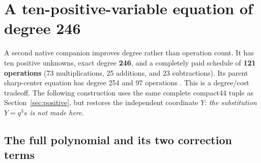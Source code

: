 \section{A ten-positive-variable equation of degree 246}\label{sec:center246}

A second native companion improves degree rather than operation count.
It has ten positive unknowns, exact degree \textbf{246}, and a completely
paid schedule of \textbf{121 operations} (73 multiplications, 25 additions,
and 23 subtractions).  Its parent sharp-center equation has degree 254
and 97 operations \cite{gapfusion}.  This is a degree/cost tradeoff.
The following construction uses the same complete compact44 tuple as
Section~\ref{sec:positive}, but restores the independent coordinate $Y$:
\emph{the substitution $Y=q^3s$ is not made here}.

\subsection{The full polynomial and its two correction terms}

